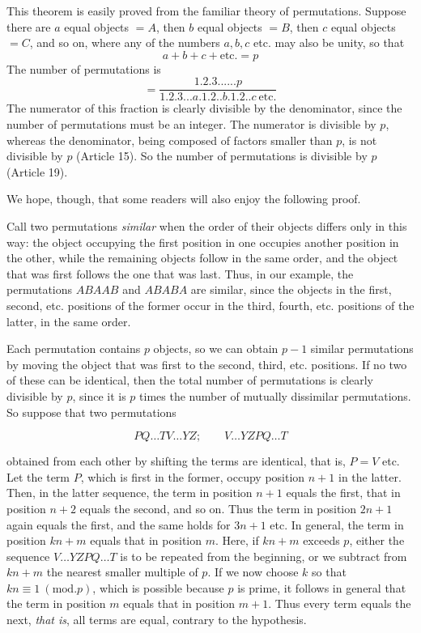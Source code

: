 This theorem is easily proved from the familiar theory of permutations. Suppose there are $a$ equal objects $=A$, then $b$ equal objects $=B$, then $c$ equal objects $=C$, and so on, where any of the numbers $a,b,c$ etc. may also be unity, so that
\[a+b+c+\mathrm{etc.}=p\]
The number of permutations is
\[=\frac{1.2.3......p}{1.2.3...a.1.2..b.1.2..c\ \mathrm{etc.}}\]
The numerator of this fraction is clearly divisible by the denominator, since the number of permutations must be an integer. The numerator is divisible by $p$, whereas the denominator, being composed of factors smaller than $p$, is not divisible by $p$ (Article 15). So the number of permutations is divisible by $p$ (Article 19).

We hope, though, that some readers will also enjoy the following proof.

Call two permutations \emph{similar} when the order of their objects differs only in this way: the object occupying the first position in one occupies another position in the other, while the remaining objects follow in the same order, and the object that was first follows the one that was last. Thus, in our example, the permutations $ABAAB$ and $ABABA$ are similar, since the objects in the first, second, etc. positions of the former occur in the third, fourth, etc. positions of the latter, in the same order.


Each permutation contains $p$ objects, so we can obtain $p-1$ similar permutations by moving the object that was first to the second, third, etc. positions. If no two of these can be identical, then the total number of permutations is clearly divisible by $p$, since it is $p$ times the number of mutually dissimilar permutations. So suppose that two permutations

\[PQ\ldots TV\ldots YZ;\qquad V\ldots YZPQ\ldots T\]

\noindent obtained from each other by shifting the terms are identical, that is, $P=V$ etc. Let the term $P$, which is first in the former, occupy position $n+1$ in the latter. Then, in the latter sequence, the term in position $n+1$ equals the first, that in position $n+2$ equals the second, and so on. Thus the term in position $2n+1$ again equals the first, and the same holds for $3n+1$ etc. In general, the term in position $kn+m$ equals that in position $m$. Here, if $kn+m$ exceeds $p$, either the sequence $V\ldots YZPQ\ldots T$ is to be repeated from the beginning, or we subtract from $kn+m$ the nearest smaller multiple of $p$. If we now choose $k$ so that $kn\equiv1\ (\mathrm{mod.}p)$, which is possible because $p$ is prime, it follows in general that the term in position $m$ equals that in position $m+1$. Thus every term equals the next, \emph{that is}, all terms are equal, contrary to the hypothesis.

